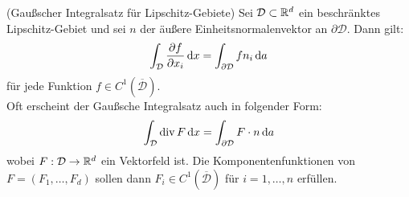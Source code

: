 %	


\begin{Satz} (Gaußscher Integralsatz für Lipschitz-Gebiete) \newline
 	Sei $\mathcal{D}  \subset \mathbb{R}^d$ ein beschränktes Lipschitz-Gebiet und sei $n$ der äußere Einheitsnormalenvektor an $\partial \mathcal{D}$. Dann gilt:
 		\begin{align*}
	 		\int_{\mathcal{D}} \frac{\partial f}{\partial x_i} \, \mathrm{d} x  = \int_{\partial \mathcal{D}} f n_i \, \mathrm{d} a
 		\end{align*}
 		für jede Funktion $f \in C^1(\overline{\mathcal{D}})$. \\ 
 		Oft erscheint der Gaußsche Integralsatz auch in folgender Form:
 		\begin{align*}
 		\int_{\mathcal{D}} \operatorname{div} F \, \mathrm{d} x =  \int_{\partial \mathcal{D}} F \cdot n \, \mathrm{d} a
 		\end{align*}
 		wobei $F:\mathcal{D} \to \mathbb{R}^d$ ein Vektorfeld ist. Die Komponentenfunktionen von $F = (F_1,\dots,F_d)$ sollen dann $F_i \in C^1(\overline{\mathcal{D}})$ für $i=1,\dots,n$ erfüllen.
\end{Satz}

